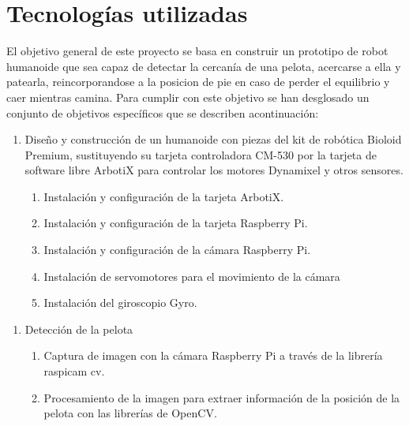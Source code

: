 \chapter{Tecnologías utilizadas}\label{chapter:Tecnologias_utilizadas}

El objetivo general de este proyecto se basa en construir un prototipo de robot humanoide que sea capaz de detectar la cercanía
de una pelota, acercarse a ella y patearla, reincorporandose a la posicion de pie en caso de perder el equilibrio y caer
mientras camina. Para cumplir con este objetivo se han desglosado un conjunto de objetivos específicos que se describen 
acontinuación: 

\begin{enumerate}
\item  Diseño y construcción de un humanoide con piezas del kit de robótica Bioloid Premium, sustituyendo su tarjeta controladora
CM-530 por la tarjeta de software libre ArbotiX para controlar los motores Dynamixel y otros sensores.
\begin{enumerate}
\item Instalación y configuración de la tarjeta ArbotiX.
\item Instalación y configuración de la tarjeta Raspberry Pi.
\item Instalación y configuración de la cámara Raspberry Pi.
\item Instalación de servomotores  para el movimiento de la cámara
\item Instalación del giroscopio Gyro.
 
\end{enumerate}
\end{enumerate}

\begin{enumerate}
\item Detección de la pelota
\begin{enumerate}
\item  Captura de imagen con la cámara Raspberry Pi a través de la librería raspicam cv.
\item Procesamiento de la imagen para extraer información de la posición de la pelota con las librerías de OpenCV.
\end{enumerate}

\end{enumerate}

